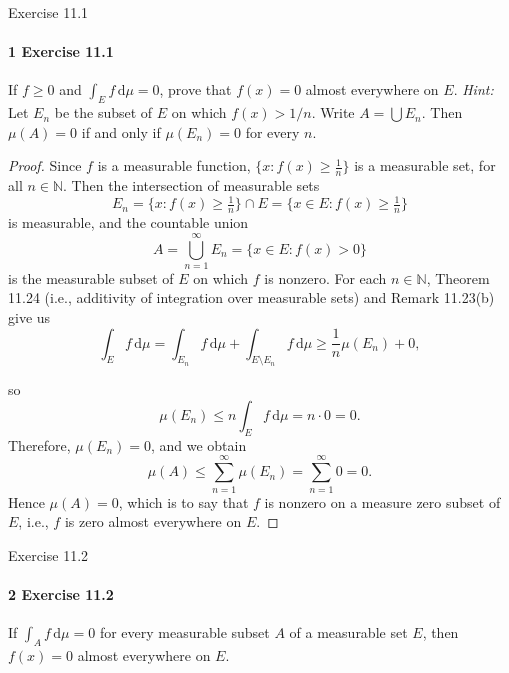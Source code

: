 \documentclass[12pt]{article}
\newenvironment{fullbox}{\begin{lrbox}{\savefullbox}\begin{minipage}{\dimexpr\textwidth-2\fboxsep\relax}}{\end{minipage}\end{lrbox}\begin{center}\framebox[\textwidth]{\usebox{\savefullbox}}\end{center}}
\newenvironment{pbox}[1][]{\begin{fullbox}\ifx#1\empty\else\paragraph{#1}\fi}{\end{fullbox}}
\newcommand{\N}{\mathbb{N}}
\newcommand{\<}{\langle}
\renewcommand{\>}{\rangle}
\newcommand{\dd}[1]{\,\mathrm{d}#1}
\begin{document}
\thispagestyle{title}

\begin{pbox}[1 Exercise 11.1]
    If $f \geq 0$ and $\int_E f \dd{\mu} = 0$, prove that $f(x)=0$ almost everywhere on $E$. \textit{Hint:} Let $E_n$ be the subset of $E$ on which $f(x) > 1/n$. Write $A = \bigcup E_n$. Then $\mu(A) = 0$ if and only if $\mu(E_n) = 0$ for every $n$.
\end{pbox}

\begin{proof}
    Since $f$ is a measurable function, $\{x : f(x) \geq \tfrac{1}{n}\}$ is a measurable set, for all $n \in \N$. Then the intersection of measurable sets
    \[
        E_n 
            = \{x : f(x) \geq \tfrac{1}{n}\} \cap E
            = \{x \in E : f(x) \geq \tfrac{1}{n}\}
    \]
    is measurable, and the countable union
    \[
        A
            = \bigcup_{n=1}^{\infty} E_n
            = \{x \in E : f(x) > 0\}
    \]
    is the measurable subset of $E$ on which $f$ is nonzero. For each $n \in \N$, Theorem 11.24 (i.e., additivity of integration over measurable sets) and Remark 11.23(b) give us
    \[
        \int_E f \dd{\mu}
            = \int_{E_n} f \dd{\mu} + \int_{E \setminus E_n} f \dd{\mu}
            \geq \frac{1}{n} \mu(E_n) + 0,
    \]

    
    so
    \[
        \mu(E_n) \leq n\int_E f \dd{\mu} = n \cdot 0 = 0.
    \]
    Therefore, $\mu(E_n) = 0$, and we obtain
    \[
        \mu(A) 
            \leq \sum_{n=1}^{\infty} \mu(E_n)
            = \sum_{n=1}^{\infty} 0
            = 0.
    \]
    Hence $\mu(A) = 0$, which is to say that $f$ is nonzero on a measure zero subset of $E$, i.e., $f$ is zero almost everywhere on $E$.

\end{proof}



\newpage
\begin{pbox}[2 Exercise 11.2]
    If $\int_A f \dd{\mu} = 0$ for every measurable subset $A$ of a measurable set $E$, then $f(x) = 0$ almost everywhere on $E$.
\end{pbox}
\end{document}
